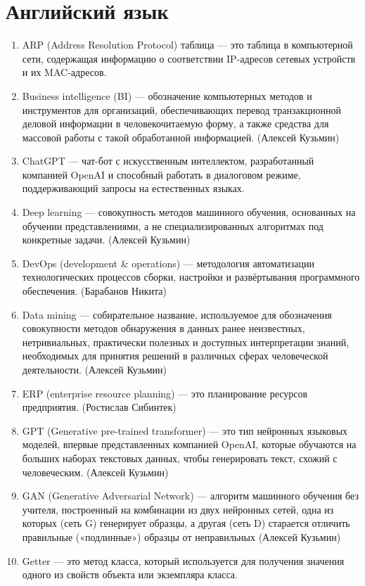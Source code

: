 \documentclass{article}
\begin{document}
\section{Английский язык}
\begin{enumerate}
    \item ARP (Address Resolution Protocol) таблица --- это таблица в компьютерной сети, содержащая информацию о соответствии IP-адресов сетевых устройств и их MAC-адресов. 
    \item Business intelligence (BI) --- обозначение компьютерных методов и инструментов для организаций, обеспечивающих перевод транзакционной деловой информации в человекочитаемую форму, а также средства для массовой работы с такой обработанной информацией. (Алексей Кузьмин)
    \item ChatGPT --- чат-бот с искусственным интеллектом, разработанный компанией OpenAI и способный работать в диалоговом режиме, поддерживающий запросы на естественных языках.
    \item Deep learning  --- совокупность методов машинного обучения, основанных на обучении представлениями, а не специализированных алгоритмах под конкретные задачи. (Алексей Кузьмин)
    \item DevOps (development & operations) --- методология автоматизации технологических процессов сборки, настройки и развёртывания программного обеспечения. (Барабанов Никита)
    \item Data mining --- собирательное название, используемое для обозначения совокупности методов обнаружения в данных ранее неизвестных, нетривиальных, практически полезных и доступных интерпретации знаний, необходимых для принятия решений в различных сферах человеческой деятельности. (Алексей Кузьмин)
    \item ERP (enterprise resource planning) --- это планирование ресурсов предприятия. (Ростислав Сибинтек)
    \item GPT (Generative pre-trained transformer) --- это тип нейронных языковых моделей, впервые представленных компанией OpenAI, которые обучаются на больших наборах текстовых данных, чтобы генерировать текст, схожий с человеческим. (Алексей Кузьмин)
    \item GAN (Generative Adversarial Network) --- алгоритм машинного обучения без учителя, построенный на комбинации из двух нейронных сетей, одна из которых (сеть G) генерирует образцы, а другая (сеть D) старается отличить правильные («подлинные») образцы от неправильных (Алексей Кузьмин)
    \item Getter --- это метод класса, который используется для получения значения одного из свойств объекта или экземпляра класса.

\end{enumerate}
\end{document}
